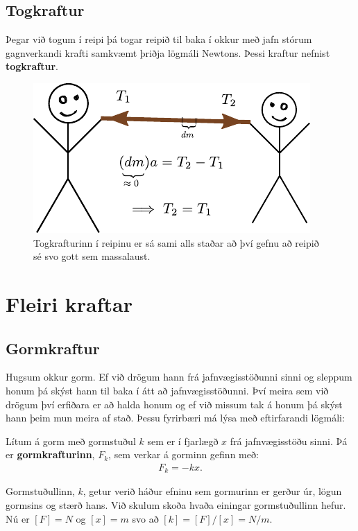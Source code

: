 \subsection*{Togkraftur}

Þegar við togum í reipi þá togar reipið til baka í okkur með jafn stórum gagnverkandi krafti samkvæmt þriðja lögmáli Newtons. Þessi kraftur nefnist \textbf{togkraftur}.

\begin{figure}[H]
    \centering
    \includegraphics{figures/togkraftur.pdf}
    \caption{Togkrafturinn í reipinu er sá sami alls staðar að því gefnu að reipið sé svo gott sem massalaust.}
    \label{fig:togkraftur}
\end{figure}


\section{Fleiri kraftar}

\subsection*{Gormkraftur}

Hugsum okkur gorm. Ef við drögum hann frá jafnvægisstöðunni sinni og sleppum honum þá skýst hann til baka í átt að jafnvægisstöðunni. Því meira sem við drögum því erfiðara er að halda honum og ef við missum tak á honum þá skýst hann þeim mun meira af stað. Þessu fyrirbæri má lýsa með eftirfarandi lögmáli:
\begin{tcolorbox}
\begin{definition}
Lítum á gorm með gormstuðul $k$ sem er í fjarlægð $x$ frá jafnvægisstöðu sinni. Þá er \textbf{gormkrafturinn}, $F_k$, sem verkar á gorminn gefinn með:
\begin{align*}
    F_k = -kx.
\end{align*}
\end{definition}
\end{tcolorbox}
Gormstuðullinn, $k$, getur verið háður efninu sem gormurinn er gerður úr, lögun gormsins og stærð hans. Við skulum skoða hvaða einingar gormstuðullinn hefur. Nú er $\left[ F \right] = \si{N}$ og $\left[x \right] = \si{m}$ svo að $\left[ k \right] = \left[F\right]/ \left[ x \right] = \si{N/m}$.

